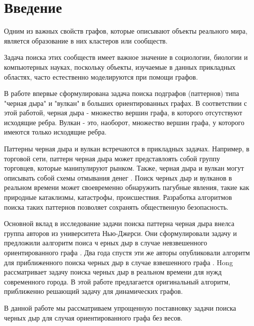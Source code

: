 \documentclass[12pt,a4paper,oneside]{article}
\theoremstyle{definition}
\theoremstyle{lemma}
\theoremstyle{remark}
\begin{document}
\setcounter{page}{2}

\tableofcontents
{}

\cleardoublepage

\section{Введение}\label{sec:otherintro}
Одним из важных свойств графов, которые описывают объекты реального мира,
является образование в них кластеров или сообществ.

Задача поиска этих сообществ имеет важное значение в социологии, биологии и компьютерных науках,
поскольку объекты, изучаемые в данных прикладных областях, часто естественно моделируются при
помощи графов. \cite{fortunato2010community}

В работе \cite{li2010detecting} впервые сформулирована задача поиска подграфов (паттернов) типа "черная дыра" и "вулкан" в больших ориентированных графах. В соответствии с этой работой, черная дыра - множество вершин графа, в которого отсутствуют исходящие ребра. Вулкан - это, наоборот, множество вершин графа, у которого имеются только исходящие ребра.

Паттерны черная дыра и вулкан встречаются в прикладных задачах. Например, в торговой сети, паттерн черная дыра может представлоять собой группу торговцев, которые манипулируют рынком. Также, черная дыра и вулкан могут описывать собой схемы отмывания денег \cite{semenov2017survey}. Поиск черных дыр и вулканов в реальном времени может  своевременно обнаружить пагубные явления, такие как природные катаклизмы, катастрофы, происшествия. Разработка алгоритмов поиска таких паттернов позволяет сохранять общественную безопасность. \cite{hong2015detecting}

Основной вклад в исследование задачи поиска паттерна черная дыра внелса группа авторов из университета Нью-Джерси. Они сформулировали задачу и предложили аалгоритм поиса ч ерных дыр в случае невзвешенного ориентированного графа \cite{li2010detecting}. Два  года спустя эти же авторы опубликовали алгоритм для приближенного поиска черных дыр в случае взвешенного графа \cite{li2012mining,li2014mining}. Hong \cite{hong2015detecting} рассматривает задачу поиска черных дыр в реальном времени для  нужд современного города. В этой работе предлагается оригинальный алгоритм, приближенно решающий задачу для динамических графов.

В данной работе мы рассматриваем упрощенную поставновку задачи поиска черных дыр для случая ориентированного графа без весов.
\end{document}
